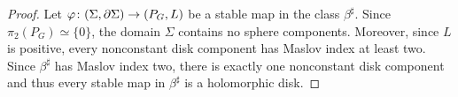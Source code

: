 \documentclass[10pt,a4paper]{amsart}
\def\to{\mathchoice{\longrightarrow}{\rightarrow}{\rightarrow}{\rightarrow}}
\begin{document}
\begin{proof}
Let $\varphi \colon (\Sigma, \partial \Sigma) \to (P_G, L)$ be a stable map in the class $\beta^\sharp$. Since $\pi_2(P_G) \simeq \{0\}$, the domain $\Sigma$ contains no sphere components. Moreover, since $L$ is positive, every nonconstant disk component has Maslov index at least two. Since $\beta^\sharp$ has Maslov index two, there is exactly one nonconstant disk component and thus every stable map in $\beta^\sharp$ is a holomorphic disk.
\end{proof}
\end{document}
